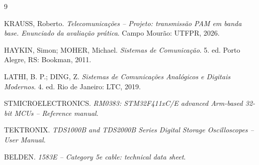 \documentclass[12pt,a4paper]{article}
\begin{document}
\begin{thebibliography}{9}

KRAUSS, Roberto. \textit{Telecomunicações -- Projeto: transmissão PAM em banda base. Enunciado da
avaliação prática}. Campo Mourão: UTFPR, 2026.

HAYKIN, Simon; MOHER, Michael. \textit{Sistemas de Comunicação}. 5. ed. Porto Alegre, RS: Bookman, 2011.

LATHI, B. P.; DING, Z. \textit{Sistemas de Comunicações Analógicos e Digitais Modernos}. 4. ed. Rio de
Janeiro: LTC, 2019.

STMICROELECTRONICS. \textit{RM0383: STM32F411xC/E advanced Arm-based 32-bit MCUs -- Reference manual}.

TEKTRONIX. \textit{TDS1000B and TDS2000B Series Digital Storage Oscilloscopes -- User Manual}.

BELDEN. \textit{1583E -- Category 5e cable: technical data sheet}.

\end{thebibliography}
\end{document}
